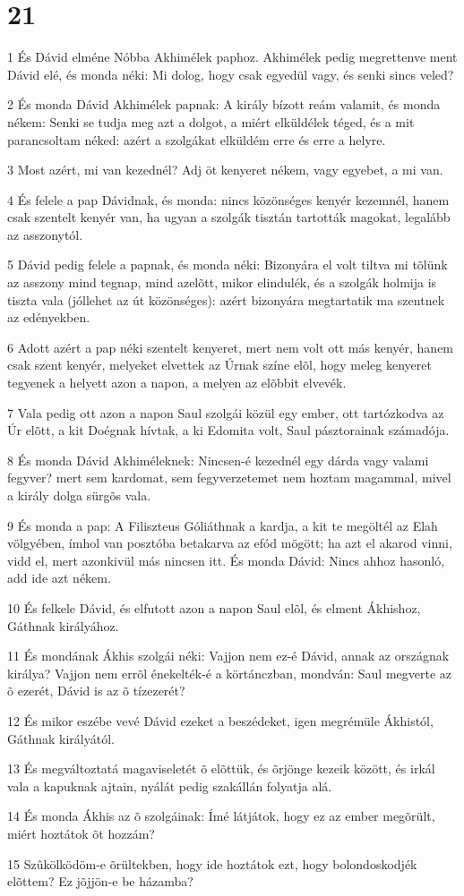 \chapter{21}

\par 1 És Dávid elméne Nóbba Akhimélek paphoz. Akhimélek pedig megrettenve ment Dávid elé, és monda néki: Mi dolog, hogy csak egyedül vagy, és senki sincs veled?
\par 2 És monda Dávid Akhimélek papnak: A király bízott reám valamit, és monda nékem: Senki se tudja meg azt a dolgot, a miért elküldélek téged, és a mit parancsoltam néked: azért a szolgákat elküldém erre és erre a helyre.
\par 3 Most azért, mi van kezednél? Adj öt kenyeret nékem, vagy egyebet, a mi van.
\par 4 És felele a pap Dávidnak, és monda: nincs közönséges kenyér kezemnél, hanem csak szentelt kenyér van, ha ugyan a szolgák tisztán tartották magokat, legalább az  asszonytól.
\par 5 Dávid pedig felele a papnak, és monda néki: Bizonyára el volt tiltva mi tõlünk az asszony mind tegnap, mind azelõtt, mikor elindulék, és a szolgák holmija is tiszta vala (jóllehet az út közönséges): azért bizonyára megtartatik ma szentnek az edényekben.
\par 6 Adott azért a pap néki szentelt kenyeret, mert nem volt ott más kenyér, hanem csak szent kenyér, melyeket elvettek az Úrnak színe elõl, hogy meleg kenyeret tegyenek a helyett azon a napon, a melyen az elõbbit elvevék.
\par 7 Vala pedig ott azon a napon Saul szolgái közül egy ember, ott tartózkodva az Úr elõtt, a kit Doégnak hívtak, a ki Edomita volt, Saul pásztorainak számadója.
\par 8 És monda Dávid Akhiméleknek: Nincsen-é kezednél egy dárda vagy valami fegyver? mert sem kardomat, sem fegyverzetemet nem hoztam magammal, mivel a király dolga sürgõs vala.
\par 9 És monda a pap: A Filiszteus Góliáthnak a kardja, a kit te megöltél az Elah völgyében, ímhol van posztóba betakarva az efód mögött; ha azt el akarod vinni, vidd el, mert azonkivül más nincsen itt. És monda Dávid: Nincs ahhoz hasonló, add ide azt nékem.
\par 10 És felkele Dávid, és elfutott azon a napon Saul elõl, és elment Ákhishoz, Gáthnak királyához.
\par 11 És mondának Ákhis szolgái néki: Vajjon nem ez-é Dávid, annak az országnak királya? Vajjon nem errõl énekelték-é a körtánczban, mondván: Saul megverte az õ ezerét, Dávid is az õ tízezerét?
\par 12 És mikor eszébe vevé Dávid ezeket a beszédeket, igen megrémüle Ákhistól, Gáthnak királyától.
\par 13 És megváltoztatá magaviseletét õ elõttük, és õrjönge kezeik között, és irkál vala a kapuknak ajtain, nyálát pedig szakállán folyatja alá.
\par 14 És monda Ákhis az õ szolgáinak: Ímé látjátok, hogy ez az ember megõrült, miért hoztátok õt hozzám?
\par 15 Szûkölködöm-e õrültekben, hogy ide hoztátok ezt, hogy bolondoskodjék elõttem? Ez jõjjön-e be házamba?

